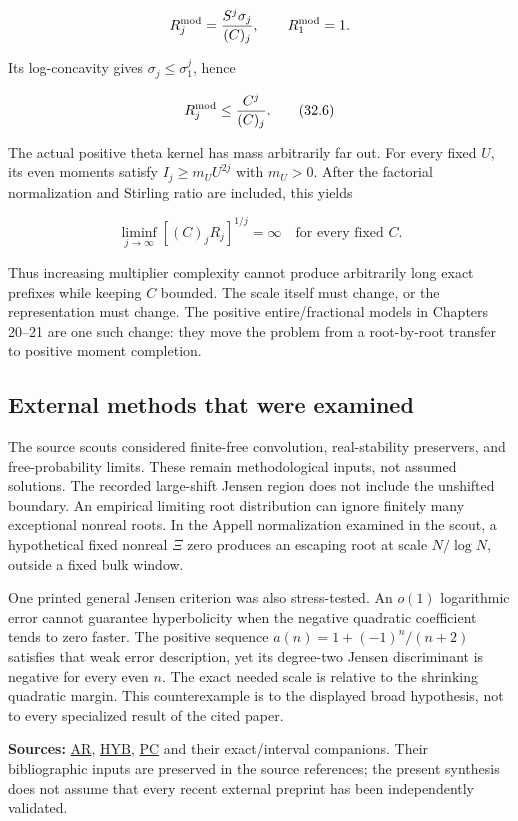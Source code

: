 \documentclass[
  10pt,
  a4paper,
  10pt,
  oneside,
  openany]{book}
\begin{document}
\[
 R_j^{\rm mod}=\frac{S^j\sigma_j}{(C)_j},\qquad R_1^{\rm mod}=1.
\]

Its log-concavity gives \(\sigma_j\le\sigma_1^j\), hence

\[
 R_j^{\rm mod}\le\frac{C^j}{(C)_j}.
 \tag{32.6}\label{eq:32.6}
\]

The actual positive theta kernel has mass arbitrarily far out. For every
fixed \(U\), its even moments satisfy \(I_j\ge m_UU^{2j}\) with
\(m_U>0\). After the factorial normalization and Stirling ratio are
included, this yields

\[
 \liminf_{j\to\infty}[(C)_jR_j]^{1/j}=\infty
 \quad\text{for every fixed }C.
 \tag{32.7}\label{eq:32.7}
\]

Thus increasing multiplier complexity cannot produce arbitrarily long
exact prefixes while keeping \(C\) bounded. The scale itself must
change, or the representation must change. The positive
entire/fractional models in Chapters 20--21 are one such change: they
move the problem from a root-by-root transfer to positive moment
completion.

\subsection{External methods that were
examined}\label{external-methods-that-were-examined}

The source scouts considered finite-free convolution, real-stability
preservers, and free-probability limits. These remain methodological
inputs, not assumed solutions. The recorded large-shift Jensen region
does not include the unshifted boundary. An empirical limiting root
distribution can ignore finitely many exceptional nonreal roots. In the
Appell normalization examined in the scout, a hypothetical fixed nonreal
\(\Xi\) zero produces an escaping root at scale \(N/\log N\), outside a
fixed bulk window.

One printed general Jensen criterion was also stress-tested. An \(o(1)\)
logarithmic error cannot guarantee hyperbolicity when the negative
quadratic coefficient tends to zero faster. The positive sequence
\(a(n)=1+(-1)^n/(n+2)\) satisfies that weak error description, yet its
degree-two Jensen discriminant is negative for every even \(n\). The
exact needed scale is relative to the shrinking quadratic margin. This
counterexample is to the displayed broad hypothesis, not to every
specialized result of the cited paper.

\textbf{Sources:} \hyperref[source-ar]{AR}, \hyperref[source-hyb]{HYB},
\hyperref[source-pc]{PC} and their exact/interval companions. Their
bibliographic inputs are preserved in the source references; the present
synthesis does not assume that every recent external preprint has been
independently validated.
\end{document}
